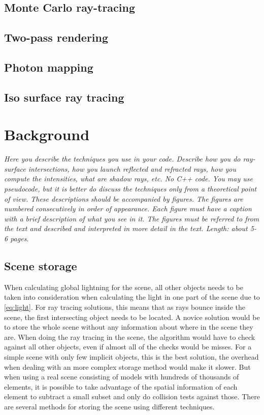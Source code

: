 \documentclass[]{report}   %
\begin{document}
\section{Monte Carlo ray-tracing}

\section{Two-pass rendering}

\section{Photon mapping}

\section{Iso surface ray tracing}

\chapter{Background}
\emph{Here you describe the techniques you use in your code. 
Describe how you do ray-surface intersections, how you launch reflected and refracted rays, how you compute the intensities, what are shadow rays, etc. No C++ code. 
You may use pseudocode, but it is better do discuss the techniques only from a theoretical point of view. 
These descriptions should be accompanied by figures. 
The figures are numbered consecutively in order of appearance. 
Each figure must have a caption with a brief description of what you see in it. 
The figures must be referred to from the text and described and interpreted in more detail in the text.
Length: about 5-6 pages.}

\section{Scene storage}
When calculating global lightning for the scene, all other objects needs to be taken into consideration when calculating the light in one part of the scene due to \autoref{eq:light}.
For ray tracing solutions, this means that as rays bounce inside the scene, the first intersecting object needs to be located.
A novice solution would be to store the whole scene without any information about where in the scene they are.
When doing the ray tracing in the scene, the algorithm would have to check against all other objects, even if almost all of the checks would be misses.
For a simple scene with only few implicit objects, this is the best solution, the overhead when dealing with an more complex storage method would make it slower.
But when using a real scene consisting of models with hundreds of thousands of elements, it is possible to take advantage of the spatial information of each element to subtract a small subset and only do collision tests against those.
There are several methods for storing the scene using different techniques.
\end{document}
